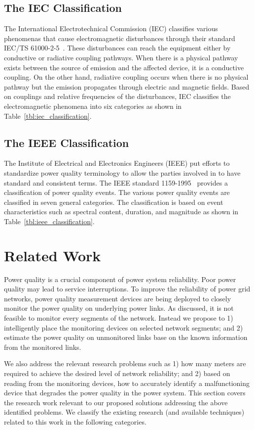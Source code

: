\subsection{The IEC Classification}
The International Electrotechnical Commission (IEC) classifies various phenomenas that cause electromagnetic disturbances through their standard IEC/TS 61000-2-5~\cite{iec_61000}. These disturbances can reach the equipment either by conductive or radiative coupling pathways. When there is a physical pathway exists between the source of emission and the affected device, it is a conductive coupling. On the other hand, radiative coupling occurs when there is no physical pathway but the emission propagates through electric and magnetic fields. Based on couplings and relative frequencies of the disturbances, IEC classifies the electromagnetic phenomena into six categories as shown in Table~\ref{tbl:iec_classification}.

\subsection{The IEEE Classification}
The Institute of Electrical and Electronics Engineers (IEEE) put efforts to standardize power quality terminology to allow the parties involved in to have standard and consistent terms. The IEEE standard 1159-1995~\cite{IEEE09_1159} provides a classification of power quality events. The various power quality events are classified in seven general categories. The classification is based on event characteristics such as spectral content, duration, and magnitude as shown in Table~\ref{tbl:ieee_classification}.

\section{Related Work}
\label{sec:related_work}
Power quality is a crucial component of power system reliability. Poor power quality may lead to service interruptions. To improve the reliability of power grid networks, power quality measurement devices are being deployed to closely monitor the  power quality on underlying power links. As discussed, it is not feasible to monitor every segments of the network. Instead we propose to 1) intelligently place the monitoring devices on selected network segments; and 2) estimate the power quality on unmonitored links base on the known information from the monitored links.

We also address the relevant research problems such as 1) how many meters are required to achieve the desired level of network reliability; and 2) based on reading from the monitoring devices, how to accurately identify a malfunctioning device that degrades the power quality in the power system. This section covers the research work relevant to our proposed solutions addressing the above identified problems. We classify the existing research (and available techniques) related to this work in the following categories.

